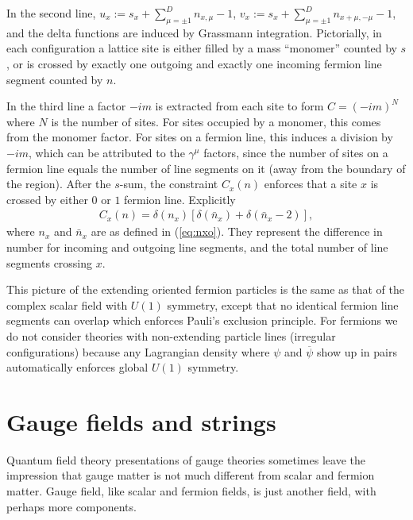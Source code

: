 \documentclass[12pt]{article}
\theoremstyle{definition}
\begin{document}
In the second line, $u_x:=s_x+\sum_{\mu=\pm 1}^D n_{x,\mu}-1$, $v_x:=s_x+\sum_{\mu=\pm 1}^D n_{x+ \mu, -\mu}-1$, and the delta functions are induced by Grassmann integration. Pictorially, in each configuration a lattice site is either filled by a mass ``monomer'' counted by $s$, or is crossed by exactly one outgoing and exactly one incoming fermion line segment counted by $n$. %

In the third line a factor $-im$ is extracted from each site to form $C=(-im)^{N}$ where $N$ is the number of sites. For sites occupied by a monomer, this comes from the monomer factor. For sites on a fermion line, this induces a division by $-im$, which can be attributed to the $\gamma^\mu$ factors, since the number of sites on a fermion line equals the number of line segments on it (away from the boundary of the region). After the $s$-sum, the constraint $C_x(n)$ enforces that a site $x$ is crossed by either $0$ or $1$ fermion line. Explicitly
\begin{align}
C_x(n)=\delta(n_x)[\delta(\bar{n}_x)+\delta(\bar{n}_x-2)],
\end{align}
where $n_x$ and $\bar{n}_x$ are as defined in (\ref{eq:nxo}). They represent the difference in number for incoming and outgoing line segments, and the total number of line segments crossing $x$.

This picture of the extending oriented fermion particles is the same as that of the complex scalar field with $U(1)$ symmetry, except that no identical fermion line segments can overlap which enforces Pauli's exclusion principle. For fermions we do not consider theories with non-extending particle lines (irregular configurations) because any Lagrangian density where $\psi$ and $\overline{\psi}$ show up in pairs automatically enforces global $U(1)$ symmetry.

\section{Gauge fields and strings}\label{sec:gfs}

Quantum field theory presentations of gauge theories sometimes leave the impression that gauge matter is not much different from scalar and fermion matter. Gauge field, like scalar and fermion fields, is just another field, with perhaps more components. 
\end{document}
